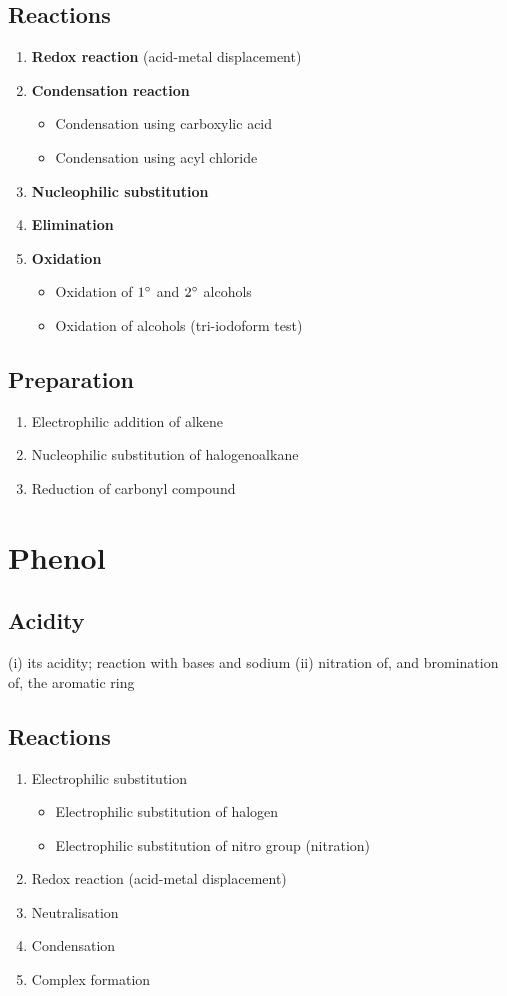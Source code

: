 \documentclass[12pt,a4 paper]{article}
\begin{document}
\subsection{Reactions}
\begin{enumerate}
\item \textbf{Redox reaction} (acid-metal displacement)
\item \textbf{Condensation reaction}
	\begin{itemize}
	\item Condensation using carboxylic acid
	\item Condensation using acyl chloride
	\end{itemize}
\item \textbf{Nucleophilic substitution}
\item \textbf{Elimination}
\item \textbf{Oxidation}
	\begin{itemize}
	\item Oxidation of $1\degree$ and $2\degree$ alcohols
	\item Oxidation of  alcohols (tri-iodoform test)
	\end{itemize}
\end{enumerate}

\subsection{Preparation}
\begin{enumerate}
\item Electrophilic addition of alkene
\item Nucleophilic substitution of halogenoalkane
\item Reduction of carbonyl compound
\end{enumerate}
\pagebreak

\section{Phenol}
\subsection{Acidity}
(i) its acidity; reaction with bases and sodium
(ii) nitration of, and bromination of, the aromatic ring

\subsection{Reactions}
\begin{enumerate}
\item Electrophilic substitution
	\begin{itemize}
	\item Electrophilic substitution of halogen
	\item Electrophilic substitution of nitro group (nitration)
	\end{itemize}
\item Redox reaction (acid-metal displacement)
\item Neutralisation
\item Condensation
\item Complex formation
\end{enumerate}
\end{document}
